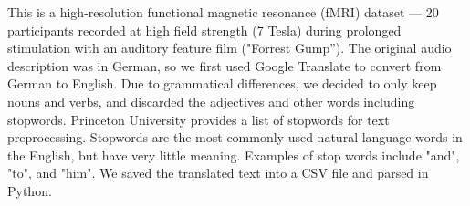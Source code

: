 \par \indent 

This is a high-resolution functional magnetic resonance (fMRI) dataset — 20 participants recorded at high field strength (7 Tesla) during prolonged stimulation with an auditory feature film ("Forrest Gump''). The original audio description was in German, so we first used Google Translate 
 to convert from German to English. Due to grammatical differences, we decided to
 only keep nouns and verbs, and discarded the adjectives and other words including
 stopwords. Princeton University provides a list of stopwords for text preprocessing.
 Stopwords are the most commonly used natural language words in the English, but have 
 very little meaning. Examples of stop words include "and", "to", and "him". We saved 
 the translated text into a CSV file and parsed in Python. 
